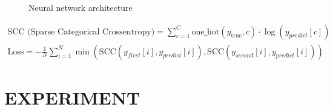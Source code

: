 \documentclass[runningheads]{llncs}
\begin{document}
{\begin{figure}
\begin{tikzpicture}[node distance=1.5cm]
    \end{tikzpicture}
    \caption{Neural network architecture}
    \label{fig:neural_network}
\end{figure}






\begin{equation}
\label{equa3}
\begin{gathered}
\text{SCC (Sparse Categorical Crossentropy)} = \sum_{c=1}^{C} \text{one\_hot}(y_{\text{true}}, c) \cdot \log(y_{predict}[c])
\\
\text{Loss} = -\frac{1}{N} \sum_{i=1}^{N} \min(\text{SCC}(y_{first}[i], y_{predict}[i]), \text{SCC}(y_{second}[i], y_{predict}[i]))
\end{gathered}
\end{equation}







\section{EXPERIMENT}\label{section4}

}
\end{document}
